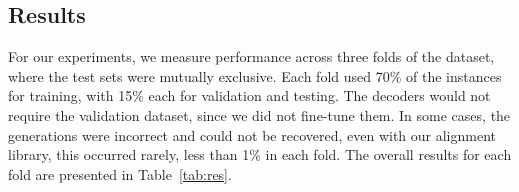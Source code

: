 \documentclass[11pt]{article}
\begin{document}
\subsection{Results}
For our experiments, we measure performance across three folds of the dataset, where the test sets were mutually exclusive. Each fold used 70\% of the instances for training, with 15\% each for validation and testing. The decoders would not require the validation dataset, since we did not fine-tune them. In some cases, the generations were incorrect and could not be recovered, even with our alignment library, this occurred rarely, less than 1\% in each fold. The overall results for each fold are presented in Table~\ref{tab:res}. 


\begin{table}[ht]
\small
\centering



\end{table}
\end{document}
